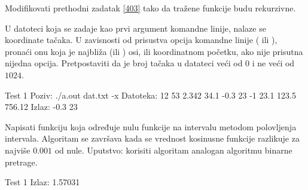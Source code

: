 \begin{Answer}[ref=403]
\end{Answer}
\begin{Exercise}[label=404]
  Modifikovati prethodni zadatak \ref{403} tako da tražene funkcije
  budu rekurzivne.
\end{Exercise}

\begin{Exercise}[label=405]
  U datoteci koja se zadaje kao prvi argument komandne linije, nalaze
  se koordinate tačaka. U zavisnosti od prisustva opcija komandne
  linije ( ili ), pronaći onu koja je najbliža
   (ili ) osi, ili koordinatnom početku, ako nije
  prisutna nijedna opcija. Pretpostaviti da je broj tačaka u datateci
  veći od $0$ i ne veći od $1024$.
  
\begin{miditest}
\begin{test}{Test 1}
Poziv: ./a.out dat.txt -x
Datoteka:
12 53
2.342 34.1
-0.3 23
-1 23.1
123.5 756.12
Izlaz: -0.3 23
\end{test}
\end{miditest}
  
\end{Exercise}

\begin{Answer}[ref=405]
\end{Answer}
\begin{Exercise}[label=406]
  Napisati funkciju koja određuje nulu funkcije  na
  intervalu \argf{[0,2]} metodom polovljenja intervala. Algoritam se
  završava kada se vrednost kosinusne funkcije razlikuje za najviše
  $0.001$ od nule. Uputstvo: korisiti algoritam analogan algoritmu
  binarne pretrage.
  
  
\begin{minitest}
\begin{test}{Test 1}
Izlaz:
1.57031
\end{test}
\end{minitest}
  
\end{Exercise}

